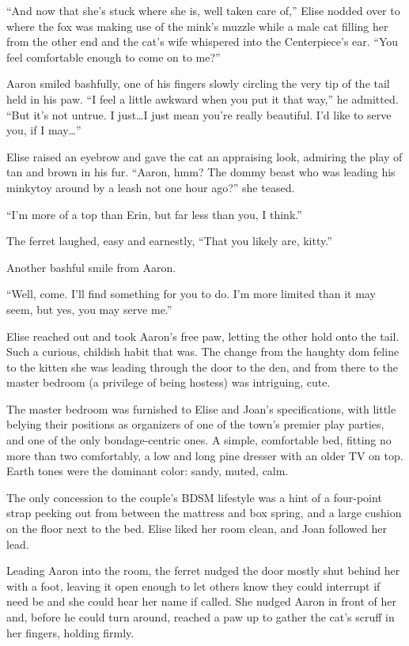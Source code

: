 ``And now that she's stuck where she is, well taken care of,'' Elise nodded over to where the fox was making use of the mink's muzzle while a male cat filling her from the other end and the cat's wife whispered into the Centerpiece's ear. ``You feel comfortable enough to come on to me?''

Aaron smiled bashfully, one of his fingers slowly circling the very tip of the tail held in his paw. ``I feel a little awkward when you put it that way,'' he admitted. ``But it's not untrue. I just\ldots{}I just mean you're really beautiful. I'd like to serve you, if I may\ldots{}''

Elise raised an eyebrow and gave the cat an appraising look, admiring the play of tan and brown in his fur. ``Aaron, hmm? The dommy beast who was leading his minkytoy around by a leash not one hour ago?'' she teased.

``I'm more of a top than Erin, but far less than you, I think.''

The ferret laughed, easy and earnestly, ``That you likely are, kitty.''

Another bashful smile from Aaron.

``Well, come. I'll find something for you to do. I'm more limited than it may seem, but yes, you may serve me.''

Elise reached out and took Aaron's free paw, letting the other hold onto the tail. Such a curious, childish habit that was. The change from the haughty dom feline to the kitten she was leading through the door to the den, and from there to the master bedroom (a privilege of being hostess) was intriguing, cute.

The master bedroom was furnished to Elise and Joan's specifications, with little belying their positions as organizers of one of the town's premier play parties, and one of the only bondage-centric ones.  A simple, comfortable bed, fitting no more than two comfortably, a low and long pine dresser with an older TV on top. Earth tones were the dominant color: sandy, muted, calm.

The only concession to the couple's BDSM lifestyle was a hint of a four-point strap peeking out from between the mattress and box spring, and a large cushion on the floor next to the bed. Elise liked her room clean, and Joan followed her lead.

Leading Aaron into the room, the ferret nudged the door mostly shut behind her with a foot, leaving it open enough to let others know they could interrupt if need be and she could hear her name if called. She nudged Aaron in front of her and, before he could turn around, reached a paw up to gather the cat's scruff in her fingers, holding firmly.

